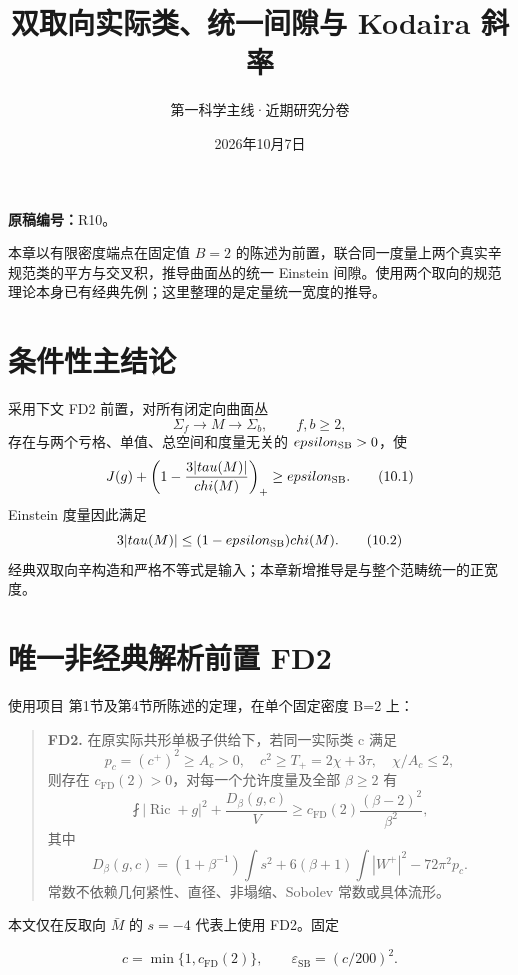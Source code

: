 \documentclass[UTF8,11pt,fontset=none]{ctexart}
\title{双取向实际类、统一间隙与 Kodaira 斜率}
\author{第一科学主线·近期研究分卷}
\date{2026年10月7日}
\begin{document}
\maketitle
\noindent\textbf{原稿编号：}R10。

本章以有限密度端点在固定值 \(B=2\) 的陈述为前置，联合同一度量上两个真实辛规范类的平方与交叉积，推导曲面丛的统一 Einstein 间隙。使用两个取向的规范理论本身已有经典先例；这里整理的是定量统一宽度的推导。\cite{R10,FD,Kotschick,LeBrunKodaira}

\section{条件性主结论}\label{ch10:ux6761ux4ef6ux6027ux4e3bux7ed3ux8bba}

采用下文 FD2 前置，对所有闭定向曲面丛 \[
\Sigma_f\longrightarrow M\longrightarrow\Sigma_b,\qquad f,b\ge2,
\] 存在与两个亏格、单值、总空间和度量无关的 \(\varepsilon_{\rm SB}>0\)，使 \[
\mathcal J(g)+\left(1-\frac{3|\tau(M)|}{\chi(M)}\right)_+
\ge\varepsilon_{\rm SB}.\tag{10.1}\label{eq:r10:1}
\] Einstein 度量因此满足 \[
3|\tau(M)|\le(1-\varepsilon_{\rm SB})\chi(M).\tag{10.2}\label{eq:r10:2}
\] 经典双取向辛构造和严格不等式是输入；本章新增推导是与整个范畴统一的正宽度。\cite{Kotschick,LeBrunKodaira}

\section{唯一非经典解析前置 FD2}\label{ch10:ux552fux4e00ux975eux7ecfux5178ux89e3ux6790ux524dux7f6e-fd2}

使用项目  第1节及第4节所陈述的定理，在单个固定密度 B=2 上：

\begin{quote}
\textbf{FD2.} 在原实际共形单极子供给下，若同一实际类 c 满足 \[
p_c=(c^+)^2\ge A_c>0,\quad c^2\ge T_+=2\chi+3\tau,
\quad\chi/A_c\le2,
\] 则存在 \(c_{\mathrm{FD}}(2)>0\)，对每一个允许度量及全部 \(\beta\ge2\) 有 \[
\fint|\operatorname{Ric}+g|^2+\frac{D_\beta(g,c)}V
\ge c_{\mathrm{FD}}(2)\frac{(\beta-2)^2}{\beta^2},
\] 其中 \[
D_\beta(g,c)=(1+\beta^{-1})\int s^2
+6(\beta+1)\int|W^+|^2-72\pi^2p_c.
\] 常数不依赖几何紧性、直径、非塌缩、Sobolev 常数或具体流形。
\end{quote}

本文仅在反取向 \(\bar M\) 的 \(s=-4\) 代表上使用 FD2。固定

\[
c=\min\{1,c_{\mathrm{FD}}(2)\},\qquad
\boxed{\varepsilon_{\mathrm{SB}}=(c/200)^2.}
\tag{10.3}\label{eq:r10:3}
\]
\end{document}

